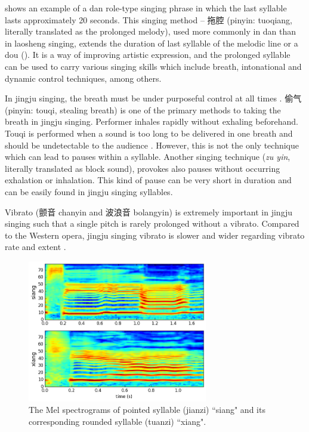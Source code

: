  shows an example of a \gls{dan} role-type singing phrase in which the last syllable lasts approximately 20 seconds. This singing method -- 拖腔 (pinyin: tuoqiang, literally translated as the prolonged melody), used more commonly in dan than in \gls{laosheng} singing, extends the duration of last syllable of the melodic line or a dou (). It is a way of improving artistic expression, and the prolonged syllable can be used to carry various singing skills which include breath, intonational and dynamic control techniques, among others. 

In jingju singing, the breath must be under purposeful control at all times \cite{Wichmann1991a}. 偷气 (pinyin: touqi, stealing breath) is one of the primary methods to taking the breath in jingju singing. Performer inhales rapidly without exhaling beforehand. Touqi is performed when a sound is too long to be delivered in one breath and should be undetectable to the audience \cite{Wichmann1991a}. However, this is not the only technique which can lead to pauses within a syllable. Another singing technique (\textit{zu yin}, literally translated as block sound), provokes also pauses without occurring exhalation or inhalation. This kind of pause can be very short in duration and can be easily found in jingju singing syllables. 

Vibrato (颤音 chanyin and 波浪音 bolangyin) is extremely important in jingju singing such that a single pitch is rarely prolonged without a vibrato. Compared to the Western opera, jingju singing vibrato is slower and wider regarding vibrato rate and extent \cite{Yang2015a}. 

\begin{figure}[ht!]
	\centering
    \includegraphics[width=0.7\textwidth]{figs/spectro_vis/ch3_jianzi_mispronunciation.png}
    \caption{The Mel spectrograms of pointed syllable (\gls{jianzi}) ``siang" and its corresponding rounded syllable (\gls{tuanzi}) ``xiang".}
    \label{fig:ch3:jianzi_mispronunciation_example}
\end{figure}

